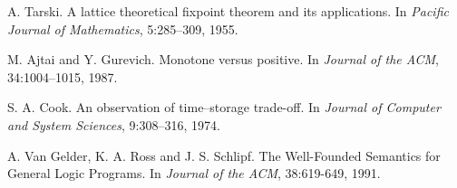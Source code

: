 \documentclass[11pt]{article}
\begin{document}
\begin{thebibliography}{9}
  A. Tarski. 
  A lattice theoretical fixpoint theorem and its applications. 
  In \textit{Pacific Journal of Mathematics}, 5:285–309, 1955.

  M. Ajtai and Y. Gurevich. 
  Monotone versus positive. 
  In \textit{Journal of the ACM}, 34:1004–1015, 1987.

  S. A. Cook. 
  An observation of time–storage trade-off. 
  In \textit{Journal of Computer and System Sciences}, 9:308–316, 1974.

  A. Van Gelder, K. A. Ross and J. S. Schlipf.
  The Well-Founded Semantics for General Logic Programs.
  In \textit{Journal of the ACM}, 38:619-649, 1991.
\end{thebibliography}
\end{document}

